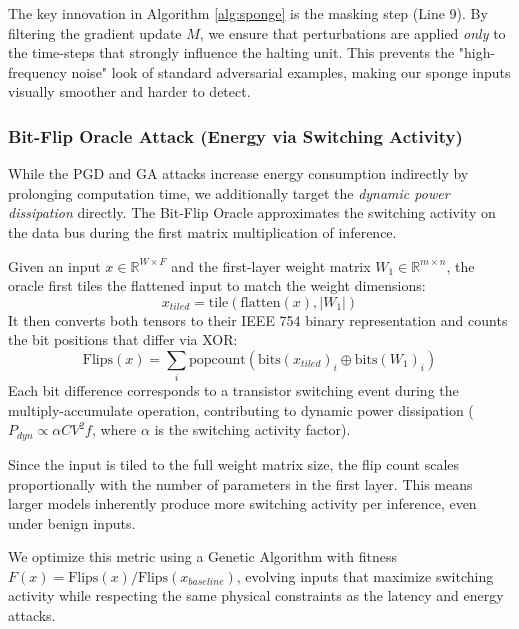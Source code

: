 The key innovation in Algorithm \ref{alg:sponge} is the masking step (Line 9). By filtering the gradient update $M$, we ensure that perturbations are applied \textit{only} to the time-steps that strongly influence the halting unit. This prevents the "high-frequency noise" look of standard adversarial examples, making our sponge inputs visually smoother and harder to detect.

\subsubsection{Bit-Flip Oracle Attack (Energy via Switching Activity)}
While the PGD and GA attacks increase energy consumption indirectly by prolonging computation time, we additionally target the \textit{dynamic power dissipation} directly. The Bit-Flip Oracle approximates the switching activity on the data bus during the first matrix multiplication of inference.

Given an input $x \in \mathbb{R}^{W \times F}$ and the first-layer weight matrix $W_1 \in \mathbb{R}^{m \times n}$, the oracle first tiles the flattened input to match the weight dimensions:
\begin{equation}
    x_{tiled} = \text{tile}(\text{flatten}(x), |W_1|)
\end{equation}
It then converts both tensors to their IEEE 754 binary representation and counts the bit positions that differ via XOR:
\begin{equation}
    \text{Flips}(x) = \sum_{i} \text{popcount}(\text{bits}(x_{tiled})_i \oplus \text{bits}(W_1)_i)
\end{equation}
Each bit difference corresponds to a transistor switching event during the multiply-accumulate operation, contributing to dynamic power dissipation ($P_{dyn} \propto \alpha C V^2 f$, where $\alpha$ is the switching activity factor).

Since the input is tiled to the full weight matrix size, the flip count scales proportionally with the number of parameters in the first layer. This means larger models inherently produce more switching activity per inference, even under benign inputs.

We optimize this metric using a Genetic Algorithm with fitness $F(x) = \text{Flips}(x) / \text{Flips}(x_{baseline})$, evolving inputs that maximize switching activity while respecting the same physical constraints as the latency and energy attacks.

